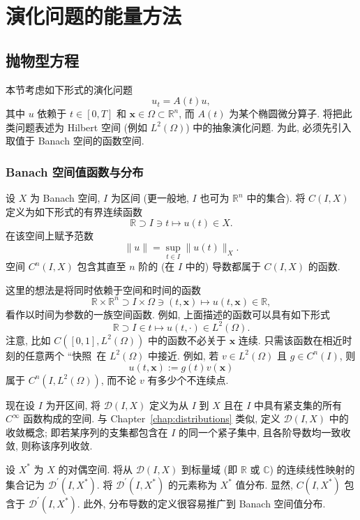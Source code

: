 \section{演化问题的能量方法}\label{chap:energy-methods-evolution-problems}

\subsection{抛物型方程}\label{sec:parabolic-equations}

本节考虑如下形式的演化问题\[u_t=A(t)u,\]其中 $u$ 依赖于 $t\in[0,T]$ 和 $\bm{x}\in\Omega\subset\mathbb{R}^n$, 而 $A(t)$ 为某个椭圆微分算子. 将把此类问题表述为 Hilbert 空间 (例如 $L^2(\Omega)$) 中的抽象演化问题. 为此, 必须先引入取值于 Banach 空间的函数空间.

\subsubsection{Banach 空间值函数与分布}\label{subsec:banach-valued-functions-distributions}

设 $X$ 为 Banach 空间, $I$ 为区间 (更一般地, $I$ 也可为 $\mathbb{R}^n$ 中的集合). 将 $C(I,X)$ 定义为如下形式的有界连续函数
\begin{equation}\label{eq:banach-valued-continuous-function-domain}
\mathbb{R}\supset I\ni t\mapsto u(t)\in X.
\end{equation}
在该空间上赋予范数
\begin{equation}\label{eq:banach-valued-continuous-function-sup-norm}
\|u\|=\sup_{t\in I}\|u(t)\|_X.
\end{equation}
空间 $C^n(I,X)$ 包含其直至 $n$ 阶的 (在 $I$ 中的) 导数都属于 $C(I,X)$ 的函数.

\begin{Example}
\label{ex:banach-valued-time-spatial-functions}
这里的想法是将同时依赖于空间和时间的函数\[\mathbb{R}\times\mathbb{R}^n\supset I\times\Omega\ni(t,\bm{x})\mapsto u(t,\bm{x})\in\mathbb{R},\]看作以时间为参数的一族空间函数. 例如, 上面描述的函数可以具有如下形式\[\mathbb{R}\supset I\in t\mapsto u(t,\cdot)\in L^2(\Omega).\]注意, 比如 $C([0,1],L^2(\Omega))$ 中的函数不必关于 $\bm{x}$ 连续. 只需该函数在相近时刻的任意两个 ``快照\textquotesingle\textquotesingle\ 在 $L^2(\Omega)$ 中接近. 例如, 若 $v\in L^2(\Omega)$ 且 $g\in C^n(I)$, 则\[u(t,\bm{x}):=g(t)v(\bm{x})\]属于 $C^n(I,L^2(\Omega))$, 而不论 $v$ 有多少个不连续点.
\end{Example}

现在设 $I$ 为开区间, 将 $\mathcal{D}(I,X)$ 定义为从 $I$ 到 $X$ 且在 $I$ 中具有紧支集的所有 $C^\infty$ 函数构成的空间. 与 Chapter~\ref{chap:distributions} 类似, 定义 $\mathcal{D}(I,X)$ 中的收敛概念; 即若某序列的支集都包含在 $I$ 的同一个紧子集中, 且各阶导数均一致收敛, 则称该序列收敛.\par 设 $X^*$ 为 $X$ 的对偶空间. 将从 $\mathcal{D}(I,X)$ 到标量域 (即 $\mathbb{R}$ 或 $\mathbb{C}$) 的连续线性映射的集合记为 $\mathcal{D}^{\prime}(I,X^*)$. 将 $\mathcal{D}^{\prime}(I,X^*)$ 的元素称为 $X^*$ 值分布. 显然, $C(I,X^*)$ 包含于 $\mathcal{D}^{\prime}(I,X^*)$. 此外, 分布导数的定义很容易推广到 Banach 空间值分布.

